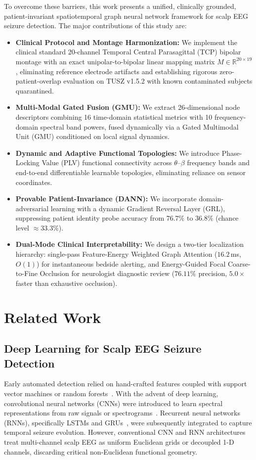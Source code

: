 \documentclass[journal]{IEEEtran}
\begin{document}
To overcome these barriers, this work presents a unified, clinically grounded, patient-invariant spatiotemporal graph neural network framework for scalp EEG seizure detection. The major contributions of this study are:
\begin{itemize}
    \item \textbf{Clinical Protocol and Montage Harmonization:} We implement the clinical standard 20-channel Temporal Central Parasagittal (TCP) bipolar montage with an exact unipolar-to-bipolar linear mapping matrix $M \in \mathbb{R}^{20 \times 19}$, eliminating reference electrode artifacts and establishing rigorous zero-patient-overlap evaluation on TUSZ v1.5.2 with known contaminated subjects quarantined.
    \item \textbf{Multi-Modal Gated Fusion (GMU):} We extract 26-dimensional node descriptors combining 16 time-domain statistical metrics with 10 frequency-domain spectral band powers, fused dynamically via a Gated Multimodal Unit (GMU) conditioned on local signal dynamics.
    \item \textbf{Dynamic and Adaptive Functional Topologies:} We introduce Phase-Locking Value (PLV) functional connectivity across $\theta$--$\beta$ frequency bands and end-to-end differentiable learnable topologies, eliminating reliance on sensor coordinates.
    \item \textbf{Provable Patient-Invariance (DANN):} We incorporate domain-adversarial learning with a dynamic Gradient Reversal Layer (GRL), suppressing patient identity probe accuracy from $76.7\%$ to $36.8\%$ (chance level $\approx 33.3\%$).
    \item \textbf{Dual-Mode Clinical Interpretability:} We design a two-tier localization hierarchy: single-pass Feature-Energy Weighted Graph Attention ($16.2$\,ms, $O(1)$) for instantaneous bedside alerting, and Energy-Guided Focal Coarse-to-Fine Occlusion for neurologist diagnostic review ($76.11\%$ precision, $5.0\times$ faster than exhaustive occlusion).
\end{itemize}

\section{Related Work}
\subsection{Deep Learning for Scalp EEG Seizure Detection}
Early automated detection relied on hand-crafted features coupled with support vector machines or random forests~\cite{ahmedt2020deep}. With the advent of deep learning, convolutional neural networks (CNNs) were introduced to learn spectral representations from raw signals or spectrograms~\cite{saab2020weak}. Recurrent neural networks (RNNs), specifically LSTMs and GRUs~\cite{cho2014learning}, were subsequently integrated to capture temporal seizure evolution. However, conventional CNN and RNN architectures treat multi-channel scalp EEG as uniform Euclidean grids or decoupled 1-D channels, discarding critical non-Euclidean functional geometry.
\end{document}

